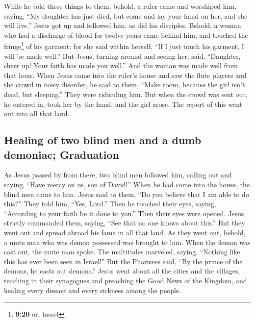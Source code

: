  While he told these things to them, behold, a ruler came
and worshiped him, saying, ``My daughter has just died, but come and lay
your hand on her, and she will live.''  Jesus got up and
followed him, as did his disciples.  Behold, a woman who
had a discharge of blood for twelve years came behind him, and touched
the fringe\footnote{\textbf{9:20} or, tassel} of his garment;
 for she said within herself, ``If I just touch his
garment, I will be made well.''  But Jesus, turning
around and seeing her, said, ``Daughter, cheer up! Your faith has made
you well.'' And the woman was made well from that hour. 
When Jesus came into the ruler's house and saw the flute players and the
crowd in noisy disorder,  he said to them, ``Make room,
because the girl isn't dead, but sleeping.'' They were ridiculing him.
 But when the crowd was sent out, he entered in, took her
by the hand, and the girl arose.  The report of this went
out into all that land.

\hypertarget{healing-of-two-blind-men-and-a-dumb-demoniac-graduation}{%
\subsection{Healing of two blind men and a dumb demoniac;
Graduation}\label{healing-of-two-blind-men-and-a-dumb-demoniac-graduation}}

 As Jesus passed by from there, two blind men followed
him, calling out and saying, ``Have mercy on us, son of David!''
 When he had come into the house, the blind men came to
him. Jesus said to them, ``Do you believe that I am able to do this?''
They told him, ``Yes, Lord.''  Then he touched their
eyes, saying, ``According to your faith be it done to you.''
 Then their eyes were opened. Jesus strictly commanded
them, saying, ``See that no one knows about this.''  But
they went out and spread abroad his fame in all that land.
 As they went out, behold, a mute man who was demon
possessed was brought to him.  When the demon was cast
out, the mute man spoke. The multitudes marveled, saying, ``Nothing like
this has ever been seen in Israel!''  But the Pharisees
said, ``By the prince of the demons, he casts out demons.''
 Jesus went about all the cities and the villages,
teaching in their synagogues and preaching the Good News of the Kingdom,
and healing every disease and every sickness among the people.

